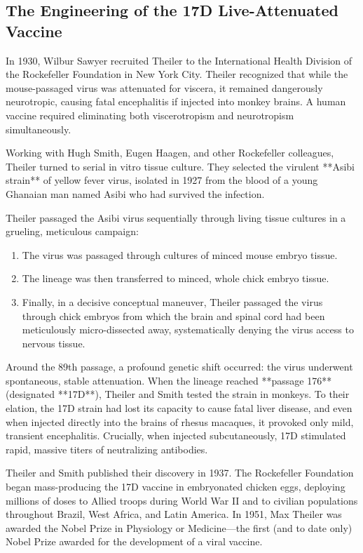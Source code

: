 \subsection{The Engineering of the 17D Live-Attenuated Vaccine}

In 1930, Wilbur Sawyer recruited Theiler to the International Health Division of the Rockefeller Foundation in New York City. Theiler recognized that while the mouse-passaged virus was attenuated for viscera, it remained dangerously neurotropic, causing fatal encephalitis if injected into monkey brains. A human vaccine required eliminating both viscerotropism and neurotropism simultaneously.

Working with Hugh Smith, Eugen Haagen, and other Rockefeller colleagues, Theiler turned to serial in vitro tissue culture. They selected the virulent **Asibi strain** of yellow fever virus, isolated in 1927 from the blood of a young Ghanaian man named Asibi who had survived the infection.

Theiler passaged the Asibi virus sequentially through living tissue cultures in a grueling, meticulous campaign:
\begin{enumerate}
    \item The virus was passaged through cultures of minced mouse embryo tissue.
    \item The lineage was then transferred to minced, whole chick embryo tissue.
    \item Finally, in a decisive conceptual maneuver, Theiler passaged the virus through chick embryos from which the brain and spinal cord had been meticulously micro-dissected away, systematically denying the virus access to nervous tissue.
\end{enumerate}

Around the 89th passage, a profound genetic shift occurred: the virus underwent spontaneous, stable attenuation. When the lineage reached **passage 176** (designated **17D**), Theiler and Smith tested the strain in monkeys. To their elation, the 17D strain had lost its capacity to cause fatal liver disease, and even when injected directly into the brains of rhesus macaques, it provoked only mild, transient encephalitis. Crucially, when injected subcutaneously, 17D stimulated rapid, massive titers of neutralizing antibodies.

Theiler and Smith published their discovery in 1937. The Rockefeller Foundation began mass-producing the 17D vaccine in embryonated chicken eggs, deploying millions of doses to Allied troops during World War II and to civilian populations throughout Brazil, West Africa, and Latin America. In 1951, Max Theiler was awarded the Nobel Prize in Physiology or Medicine—the first (and to date only) Nobel Prize awarded for the development of a viral vaccine.

